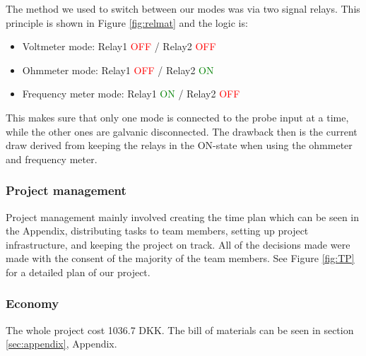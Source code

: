 \noindent The method we used to switch between our modes was via two signal relays. This principle is shown in Figure \ref{fig:relmat} and the logic is:

\begin{itemize}
    \item Voltmeter mode: Relay1 \textcolor{red}{OFF} / Relay2 \textcolor{red}{OFF}
    \item Ohmmeter mode:  Relay1 \textcolor{red}{OFF} / Relay2 \textcolor{green}{ON}
    \item Frequency meter mode: Relay1 \textcolor{green}{ON} / Relay2 \textcolor{red}{OFF}
\end{itemize}

\noindent This makes sure that only one mode is connected to the probe input at a time, while the other ones are galvanic disconnected. The drawback then is the current draw derived from keeping the relays in the ON-state when using the ohmmeter and frequency meter.

\subsubsection{Project management}
Project management mainly involved creating the time plan which can be seen in the Appendix, distributing tasks to team members, setting up project infrastructure, and keeping the project on track. All of the decisions made were made with the consent of the majority of the team members. See Figure \ref{fig:TP} for a detailed plan of our project.

\subsubsection{Economy}
The whole project cost 1036.7 DKK. The bill of materials can be seen in section \ref{sec:appendix}, Appendix.